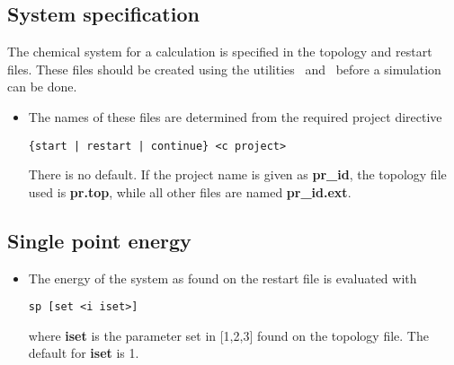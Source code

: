 \subsection{System specification}
The chemical system for a calculation is specified in the topology
and restart files. These files should be created using the utilities
\nwtop\ and \nwrst\ before a simulation can be done.
\begin{itemize}
\item
The names of these files are determined from the required project directive
\begin{verbatim}
{start | restart | continue} <c project>
\end{verbatim}
There is no default. If the project name is given as {\bf pr\_id},
the topology file used is {\bf pr.top}, while all other files
are named {\bf pr\_id.ext}.
\end{itemize}
\subsection{Single point energy}
\begin{itemize}
\item
The energy of the system as found on the restart file is evaluated with
\begin{verbatim}
sp [set <i iset>]
\end{verbatim}
where {\bf iset} is the parameter set in [1,2,3] found on the
topology file. The default for {\bf iset} is 1.
\end{itemize}
